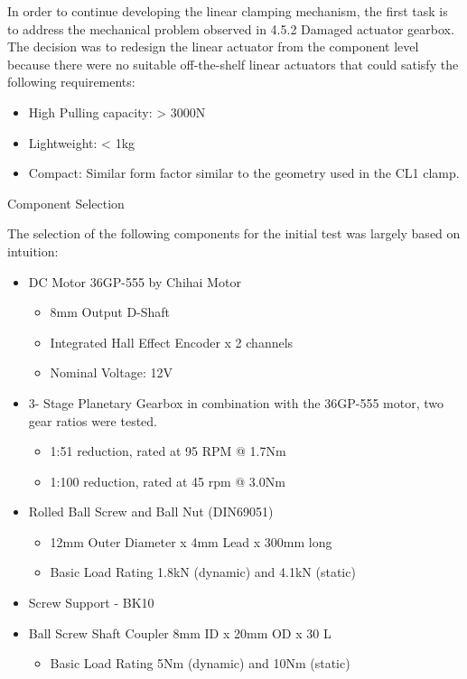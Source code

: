 In order to continue developing the linear clamping mechanism, the first task is to address the mechanical problem observed in 4.5.2 Damaged actuator gearbox. The decision was to redesign the linear actuator from the component level because there were no suitable off-the-shelf linear actuators that could satisfy the following requirements:
\begin{itemize}
    \item High Pulling capacity: > 3000N
    \item Lightweight: < 1kg
    \item Compact: Similar form factor similar to the geometry used in the CL1 clamp.
\end{itemize}

Component Selection

The selection of the following components for the initial test was largely based on intuition:
\begin{itemize}
    \item DC Motor 36GP-555 by Chihai Motor
    \begin{itemize}
        \item 8mm Output D-Shaft 
        \item Integrated Hall Effect Encoder x 2 channels
        \item Nominal Voltage: 12V
    \end{itemize}
    \item 3- Stage Planetary Gearbox in combination with the 36GP-555 motor, two gear ratios were tested.
    \begin{itemize}
        \item 1:51 reduction, rated at 95 RPM @ 1.7Nm
        \item 1:100 reduction, rated at 45 rpm @ 3.0Nm
    \end{itemize} 
    \item  Rolled Ball Screw and Ball Nut (DIN69051)
    \begin{itemize}
        \item 12mm Outer Diameter x 4mm Lead x 300mm long
        \item Basic Load Rating 1.8kN (dynamic) and 4.1kN (static)
    \end{itemize}
    \item Screw Support - BK10
    \item Ball Screw Shaft Coupler 8mm ID x 20mm OD x 30 L
    \begin{itemize}
        \item Basic Load Rating 5Nm (dynamic) and 10Nm (static)
    \end{itemize}
\end{itemize}

